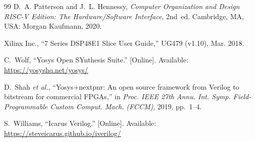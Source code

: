 \documentclass[conference]{IEEEtran}
\begin{document}
\begin{thebibliography}{99}
D.~A. Patterson and J.~L. Hennessy, \emph{Computer Organization and Design
RISC-V Edition: The Hardware/Software Interface}, 2nd~ed. Cambridge, MA,
USA: Morgan Kaufmann, 2020.

Xilinx Inc., ``7 Series DSP48E1 Slice User Guide,'' UG479 (v1.10), Mar. 2018.

C.~Wolf, ``Yosys Open SYnthesis Suite.'' [Online]. Available:
\url{https://yosyshq.net/yosys/}

D.~Shah \emph{et al.}, ``Yosys+nextpnr: An open source framework from Verilog
to bitstream for commercial FPGAs,'' in \emph{Proc. IEEE 27th Annu. Int. Symp.
Field-Programmable Custom Comput. Mach. (FCCM)}, 2019, pp.~1--4.

S.~Williams, ``Icarus Verilog.'' [Online]. Available:
\url{https://steveicarus.github.io/iverilog/}

\end{thebibliography}
\end{document}
